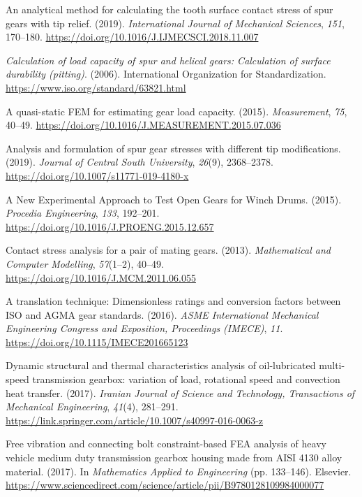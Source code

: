 \documentclass[12pt,a4paper]{article}
\begin{document}
\label{csl:9}{An analytical method for calculating the tooth surface contact stress of spur gears with tip relief}. (2019). \textit{International Journal of Mechanical Sciences}, \textit{151}, 170–180. \url{https://doi.org/10.1016/J.IJMECSCI.2018.11.007}

\label{csl:10}\textit{{Calculation of load capacity of spur and helical gears: Calculation of surface durability (pitting)}}. (2006). International Organization for Standardization. \url{https://www.iso.org/standard/63821.html}

\label{csl:11}{A quasi-static FEM for estimating gear load capacity}. (2015). \textit{Measurement}, \textit{75}, 40–49. \url{https://doi.org/10.1016/J.MEASUREMENT.2015.07.036}

\label{csl:12}{Analysis and formulation of spur gear stresses with different tip modifications}. (2019). \textit{Journal of Central South University}, \textit{26}(9), 2368–2378. \url{https://doi.org/10.1007/s11771-019-4180-x}

\label{csl:13}{A New Experimental Approach to Test Open Gears for Winch Drums}. (2015). \textit{Procedia Engineering}, \textit{133}, 192–201. \url{https://doi.org/10.1016/J.PROENG.2015.12.657}

\label{csl:14}{Contact stress analysis for a pair of mating gears}. (2013). \textit{Mathematical and Computer Modelling}, \textit{57}(1–2), 40–49. \url{https://doi.org/10.1016/J.MCM.2011.06.055}

\label{csl:15}{A translation technique: Dimensionless ratings and conversion factors between ISO and AGMA gear standards}. (2016). \textit{ASME International Mechanical Engineering Congress and Exposition, Proceedings (IMECE)}, \textit{11}. \url{https://doi.org/10.1115/IMECE201665123}

\label{csl:16}{Dynamic structural and thermal characteristics analysis of oil-lubricated multi-speed transmission gearbox: variation of load, rotational speed and convection heat transfer}. (2017). \textit{Iranian Journal of Science and Technology, Transactions of Mechanical Engineering}, \textit{41}(4), 281–291. \url{https://link.springer.com/article/10.1007/s40997-016-0063-z}

\label{csl:17}{Free vibration and connecting bolt constraint-based FEA analysis of heavy vehicle medium duty transmission gearbox housing made from AISI 4130 alloy material}. (2017). In \textit{Mathematics Applied to Engineering} (pp. 133–146). Elsevier. \url{https://www.sciencedirect.com/science/article/pii/B9780128109984000077}
\end{document}

